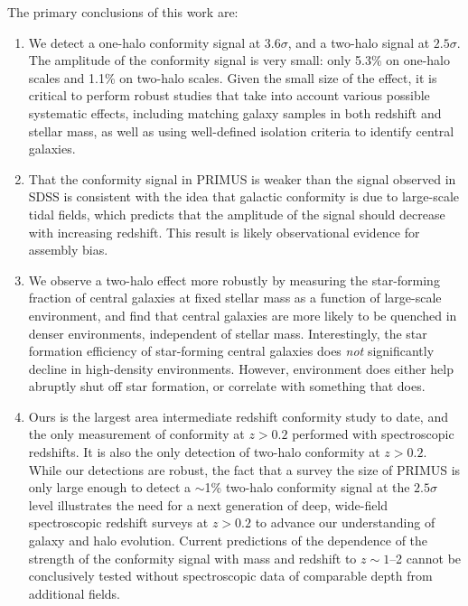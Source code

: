 The primary conclusions of this work are:
\begin{enumerate}

\item
We detect a one-halo conformity signal at $3.6\sigma$, and a two-halo signal at $2.5\sigma$.  
The amplitude of the conformity signal is very small: only 5.3\% on one-halo 
scales and 1.1\% on two-halo scales.
Given the small size of the effect, it is critical to perform robust studies that take into account various possible 
systematic effects, including matching galaxy samples in both redshift and 
stellar mass, as well as using well-defined isolation criteria to identify central galaxies.

\item
That the conformity signal in PRIMUS is weaker than the signal observed in SDSS is consistent with the idea that galactic conformity is due to large-scale tidal fields, which predicts that the amplitude of the signal should decrease with increasing redshift.
This result is likely observational evidence for assembly bias.

\item
We observe a two-halo effect more robustly by measuring the star-forming fraction of central galaxies at fixed stellar mass as a function of large-scale environment, and find that central galaxies are more likely to be quenched in denser environments, independent of stellar mass.
Interestingly, the star formation efficiency of star-forming central galaxies does \emph{not} significantly decline in high-density environments.
However, environment does either help abruptly shut off star formation, or correlate with something that does.

\item
Ours is the largest area intermediate redshift conformity study to date, 
and the only measurement of conformity at $z>0.2$ performed with spectroscopic redshifts.
It is also the only detection of two-halo conformity at $z>0.2$.  
While our detections are robust, the fact that a survey the size of 
PRIMUS is only large enough to detect a $\sim$1\% two-halo conformity signal 
at the $2.5\sigma$ level illustrates the need for a next generation of 
deep, wide-field spectroscopic redshift surveys at $z>0.2$ to advance our understanding of galaxy and halo evolution.
Current predictions of the dependence of the strength of the conformity 
signal with mass and redshift to $z\sim1$--2 cannot be conclusively tested 
without spectroscopic data of comparable depth from additional fields.

\end{enumerate}